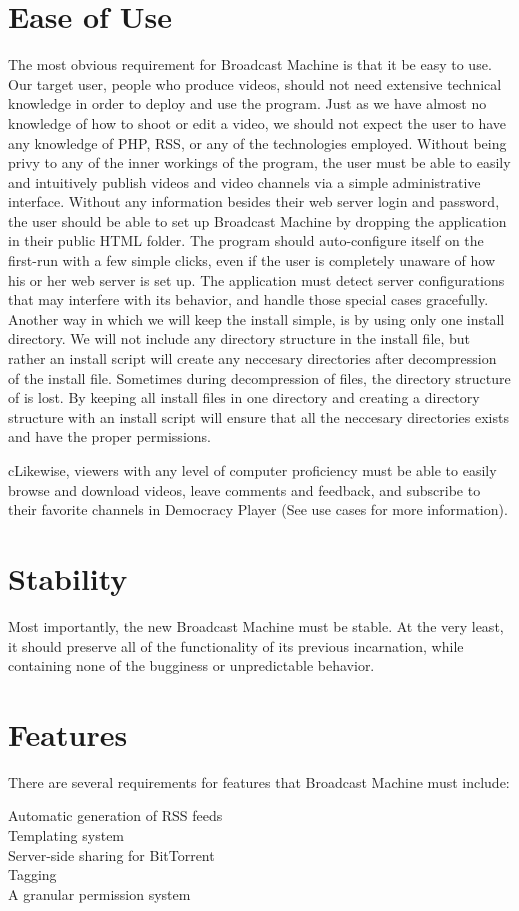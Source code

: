 \documentclass[a4paper,12pt]{report}
\begin{document}
\section{Ease of Use}
The most obvious requirement for Broadcast Machine is that it be easy to use. 
Our target user, people who produce videos, should not need extensive technical knowledge in order to deploy and use the program. 
Just as we have almost no knowledge of how to shoot or edit a video, we should not expect the user to have any knowledge of PHP, RSS, or any of the technologies employed. 
Without being privy to any of the inner workings of the program, the user must be able to easily and intuitively publish videos and video channels via a simple administrative interface. 
Without any information besides their web server login and password, the user should be able to set up Broadcast Machine by dropping the application in their public HTML folder. 
The program should auto-configure itself on the first-run with a few simple clicks, even if the user is completely unaware of how his or her web server is set up. 
The application must detect server configurations that may interfere with its behavior, and handle those special cases gracefully. 
Another way in which we will keep the install simple, is by using only one install directory. 
We will not include any directory structure in the install file, but rather an install script will create any neccesary directories after decompression of the install file. 
Sometimes during decompression of files, the directory structure of is lost. 
By keeping all install files in one directory and creating a directory structure with an install script will ensure that all the neccesary directories exists and have the proper permissions. 


cLikewise, viewers with any level of computer proficiency must be able to easily browse and download videos, leave comments and feedback, and subscribe to their favorite channels in Democracy Player (See use cases for more information).
 

\section{Stability}
Most importantly, the new Broadcast Machine must be stable.
At the very least, it should preserve all of the functionality of its previous incarnation, while containing none of the bugginess or unpredictable behavior.


\section{Features}
There are several requirements for features that Broadcast Machine must include:
\begin{description}
\item[Automatic generation of RSS feeds]
\item[Templating system]
\item[Server-side sharing for BitTorrent]
\item[Tagging]
\item[A granular permission system]
\end{description}
\end{document}
